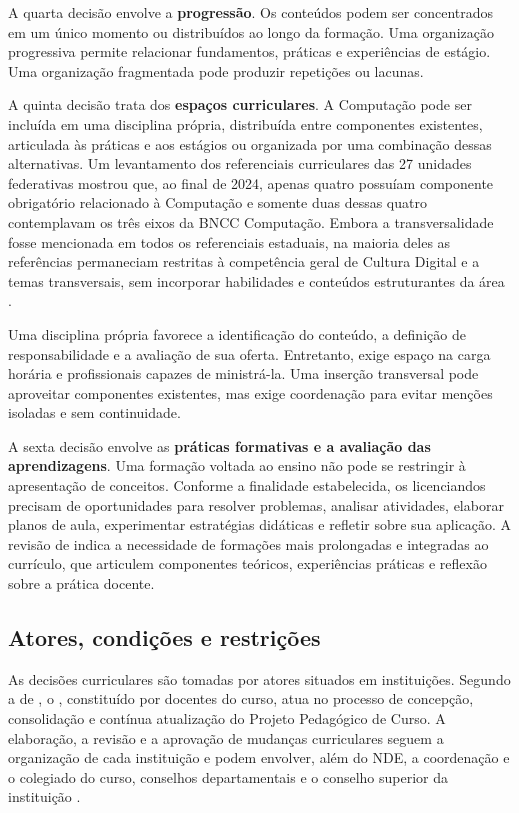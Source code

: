 A quarta decisão envolve a \textbf{progressão}. Os conteúdos podem ser concentrados em um único momento ou distribuídos ao longo da formação. Uma organização progressiva permite relacionar fundamentos, práticas e experiências de estágio. Uma organização fragmentada pode produzir repetições ou lacunas.

A quinta decisão trata dos \textbf{espaços curriculares}. A Computação pode ser incluída em uma disciplina própria, distribuída entre componentes existentes, articulada às práticas e aos estágios ou organizada por uma combinação dessas alternativas. Um levantamento dos referenciais curriculares das 27 unidades federativas mostrou que, ao final de 2024, apenas quatro possuíam componente obrigatório relacionado à Computação e somente duas dessas quatro contemplavam os três eixos da BNCC Computação. Embora a transversalidade fosse mencionada em todos os referenciais estaduais, na maioria deles as referências permaneciam restritas à competência geral de Cultura Digital e a temas transversais, sem incorporar habilidades e conteúdos estruturantes da área \cite{telefonica2025curriculos}.

Uma disciplina própria favorece a identificação do conteúdo, a definição de responsabilidade e a avaliação de sua oferta. Entretanto, exige espaço na carga horária e profissionais capazes de ministrá-la. Uma inserção transversal pode aproveitar componentes existentes, mas exige coordenação para evitar menções isoladas e sem continuidade.

A sexta decisão envolve as \textbf{práticas formativas e a avaliação das aprendizagens}. Uma formação voltada ao ensino não pode se restringir à apresentação de conceitos. Conforme a finalidade estabelecida, os licenciandos precisam de oportunidades para resolver problemas, analisar atividades, elaborar planos de aula, experimentar estratégias didáticas e refletir sobre sua aplicação. A revisão de  indica a necessidade de formações mais prolongadas e integradas ao currículo, que articulem componentes teóricos, experiências práticas e reflexão sobre a prática docente.

\subsection{Atores, condições e restrições}
\label{subsec:atores-condicoes-restricoes}

As decisões curriculares são tomadas por atores situados em instituições. Segundo a  de \citeyear{brasil2010resolucaoconaes}, o , constituído por docentes do curso, atua no processo de concepção, consolidação e contínua atualização do Projeto Pedagógico de Curso. A elaboração, a revisão e a aprovação de mudanças curriculares seguem a organização de cada instituição e podem envolver, além do NDE, a coordenação e o colegiado do curso, conselhos departamentais e o conselho superior da instituição \cite{silva2020gestao}.

